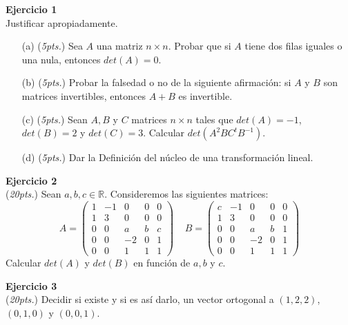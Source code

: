 \documentclass{article}
\newenvironment{problem}[2][Ejercicio]
    { \begin{mdframed}[backgroundcolor=gray!20] \textbf{#1 #2} \\}
    {  \end{mdframed}}
\begin{document}
\begin{problem}{1}
    Justificar apropiadamente.
    \begin{enumerate}
        \item[(a)] (\textit{5pts.}) Sea $A$ una matriz $n \times n$. Probar que si $A$ tiene dos filas iguales o una nula, entonces $det(A)=0$.
        \item[(b)] (\textit{5pts.}) Probar la falsedad o no de la siguiente afirmación: si $A$ y $B$ son matrices invertibles, entonces $A+B$ es invertible.
        \item[(c)] (\textit{5pts.}) Sean $A,B$ y $C$ matrices $n\times n $ tales que $det(A)=-1$, $det(B)=2$ y $det(C)=3$. Calcular $det(A^2BC^tB^{-1})$.  
        \item[(d)] (\textit{5pts.}) Dar la Definición del núcleo de una transformación lineal.
    \end{enumerate}
\end{problem}

\begin{problem}{2}
    (\textit{20pts.}) Sean $a,b,c \in \mathbb{R}$. Consideremos las siguientes matrices:
    $$
    A = 
    \begin{pmatrix}
        1 & -1 & 0 & 0 & 0 \\
        1 & 3 & 0 & 0 & 0 \\
        0 & 0 & a & b & c \\
        0 & 0 & -2 & 0 & 1 \\
        0 & 0 & 1 & 1 & 1 
    \end{pmatrix} \ \ \ \ \ 
    B =
    \begin{pmatrix}
        c & -1 & 0 & 0 & 0 \\
        1 & 3 & 0 & 0 & 0 \\
        0 & 0 & a & b & 1 \\
        0 & 0 & -2 & 0 & 1 \\
        0 & 0 & 1 & 1 & 1
    \end{pmatrix}
    $$
    Calcular $det(A)$ y $det(B)$ en función de $a,b$ y $c$.
\end{problem}

\begin{problem}{3}
    (\textit{20pts.}) Decidir si existe y si es así darlo, un vector ortogonal a $(1,2,2)$, $(0,1,0)$ y $(0,0,1)$.  
\end{problem}
\end{document}
